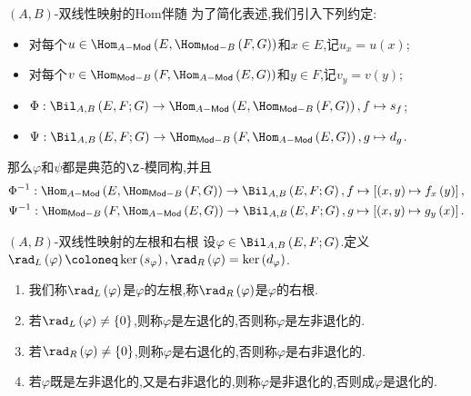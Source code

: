 \begin{proposition}{$\left(A,B\right)$-双线性映射的Hom伴随}{}
	为了简化表述,我们引入下列约定:
	\begin{itemize}
		\item 对每个$u\in\Hom_{A-\mathsf{Mod}}\left(E,\Hom_{\mathsf{Mod}-B}\left(F,G\right)\right)$和$x\in E$,记$u_{x}=u\left(x\right)$;
		\item 对每个$v\in\Hom_{\mathsf{Mod}-B}\left(F,\Hom_{A-\mathsf{Mod}}\left(E,G\right)\right)$和$y\in F$,记$v_{y}=v\left(y\right)$;
		\item $\Phi:\Bil_{A,B}\left(E,F;G\right)\to\Hom_{A-\mathsf{Mod}}\left(E,\Hom_{\mathsf{Mod}-B}\left(F,G\right)\right),f\mapsto s_{f}$;
		\item $\Psi:\Bil_{A,B}\left(E,F;G\right)\to\Hom_{\mathsf{Mod}-B}\left(F,\Hom_{A-\mathsf{Mod}}\left(E,G\right)\right),g\mapsto d_{g}$.
	\end{itemize}
	那么$\varphi$和$\psi$都是典范的$\Z$-模同构,并且
	\begin{gather*}
		\Phi^{-1}:\Hom_{A-\mathsf{Mod}}\left(E,\Hom_{\mathsf{Mod}-B}\left(F,G\right)\right)\to\Bil_{A,B}\left(E,F;G\right),f\mapsto\left[\left(x,y\right)\mapsto f_{x}\left(y\right)\right],\\
		\Psi^{-1}:\Hom_{\mathsf{Mod}-B}\left(F,\Hom_{A-\mathsf{Mod}}\left(E,G\right)\right)\to\Bil_{A,B}\left(E,F;G\right),g\mapsto\left[\left(x,y\right)\mapsto g_{y}\left(x\right)\right].
	\end{gather*}
\end{proposition}

\begin{definition}{$\left(A,B\right)$-双线性映射的左根和右根}{}
	设$\varphi\in\Bil_{A,B}\left(E,F;G\right)$.定义$\rad_{L}\left(\varphi\right)\coloneq\ker\left(s_{\varphi}\right),\rad_{R}\left(\varphi\right)=\ker\left(d_{\varphi}\right)$.
	\begin{enumerate}
		\item 我们称$\rad_{L}\left(\varphi\right)$是$\varphi$的左根,称$\rad_{R}\left(\varphi\right)$是$\varphi$的右根.
		\item 若$\rad_{L}\left(\varphi\right)\neq\left\{0\right\}$,则称$\varphi$是左退化的,否则称$\varphi$是左非退化的.
		\item 若$\rad_{R}\left(\varphi\right)\neq\left\{0\right\}$,则称$\varphi$是右退化的,否则称$\varphi$是右非退化的.
		\item 若$\varphi$既是左非退化的,又是右非退化的,则称$\varphi$是非退化的,否则成$\varphi$是退化的.
	\end{enumerate}
\end{definition}

